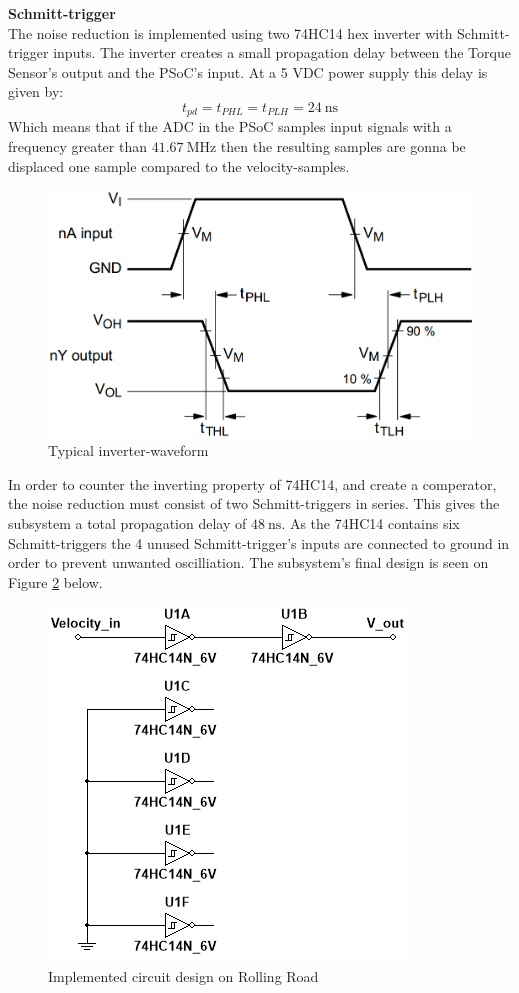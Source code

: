 \textbf{Schmitt-trigger}\\
The noise reduction is implemented using two 74HC14 hex inverter with Schmitt-trigger inputs\cite{74HC14}. The inverter creates a small propagation delay between the Torque Sensor's output and the PSoC's input. At a 5 VDC power supply this delay is given by:
\begin{equation}
	t_{pd} = t_{PHL} = t_{PLH} = \SI{24}{\nano \second}
\end{equation}
Which means that if the ADC in the PSoC samples input signals with a frequency greater than $\SI{41.67}{\mega \hertz}$ then the resulting samples are gonna be displaced one sample compared to the velocity-samples.

\begin{figure}[H]
	\centering
	\includegraphics[width=0.5\linewidth]{Hardware/Pictures/74HC14_waveform}
	\caption{Typical inverter-waveform}
	\label{fig:SchmittTrigger_waveform}
\end{figure}

In order to counter the inverting property of 74HC14, and create a comperator, the noise reduction  must consist of two Schmitt-triggers in series. This gives the subsystem a total propagation delay of $\SI{48}{\nano \second}$. As the 74HC14 contains six Schmitt-triggers the 4 unused Schmitt-trigger's inputs are connected to ground in order to prevent unwanted oscilliation. The subsystem's final design is seen on Figure \ref{fig:SignalConverterVelocity} below.

\begin{figure}[H]
	\centering
	\includegraphics[width=0.5\linewidth]{Hardware/SignalConverter/VelocityDesign}
	\caption{Implemented circuit design on Rolling Road}
	\label{fig:SignalConverterVelocity}
\end{figure}


